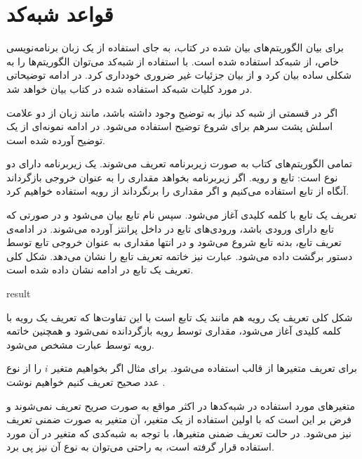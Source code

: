 \section*{قواعد شبه‌کد}

برای بیان الگوریتم‌های بیان شده در کتاب، به جای استفاده از یک زبان برنامه‌نویسی خاص، از شبه‌کد استفاده شده است. با استفاده از شبه‌کد می‌توان الگوریتم‌ها را به شکلی ساده بیان کرد و از بیان جزئیات غیر ضروری خودداری کرد. در ادامه توضیحاتی در مورد کلیات شبه‌کد استفاده شده در کتاب بیان خواهد شد.

اگر در قسمتی از شبه کد نیاز به توضیح وجود داشته باشد، مانند زبان {} از دو علامت اسلش پشت سرهم برای شروع توضیح استفاده می‌شود. در ادامه نمونه‌ای از یک توضیح آورده شده است.
\begin{latin}
\end{latin}

تمامی الگوریتم‌های کتاب به صورت زیربرنامه تعریف می‌شوند. یک زیربرنامه دارای دو نوع است: تابع و رویه. اگر زیربرنامه بخواهد مقداری را به عنوان خروجی بازگرداند آنگاه از تابع استفاده می‌کنیم و اگر مقداری را برنگرداند از رویه استفاده خواهیم کرد. 

تعریف یک تابع با کلمه کلیدی {} آغاز می‌شود. سپس نام تابع بیان می‌شود و در صورتی که تابع دارای ورودی باشد، ورودی‌های تابع در داخل پرانتز آورده می‌شوند. در ادامه‌ی تعریف تابع، بدنه تابع شروع می‌شود و در انتها مقداری به عنوان خروجی تابع توسط دستور {} برگشت داده می‌شود. عبارت {} نیز خاتمه تعریف تابع را نشان می‌دهد. شکل کلی تعریف یک تابع در ادامه نشان داده شده است.
\begin{latin}
\begin{algorithmic}[1]
	\State	{}
	\State	\Return result
\EndFunction
\end{algorithmic}
\end{latin}
شکل کلی تعریف یک رویه هم مانند یک تابع است با این تفاوت‌ها که تعریف یک رویه با کلمه کلیدی {} آغاز می‌شود، مقداری توسط رویه بازگردانده نمی‌شود و همچنین خاتمه رویه توسط عبارت {} مشخص می‌شود.

برای تعریف متغیرها از قالب {} استفاده می‌شود. برای مثال اگر بخواهیم متغیر {$i$} را از نوع عدد صحیح تعریف کنیم خواهیم نوشت {}.

متغیرهای مورد استفاده در شبه‌کد‌ها در اکثر مواقع به صورت صریح تعریف نمی‌شوند و فرض بر این است که با اولین استفاده از یک متغیر، آن متغیر به صورت ضمنی تعریف نیز می‌شود. در حالت تعریف ضمنی متغیرها، با توجه به شبه‌کدی که متغیر در آن مورد استفاده قرار گرفته است، به راحتی می‌توان به نوع آن نیز پی برد.

